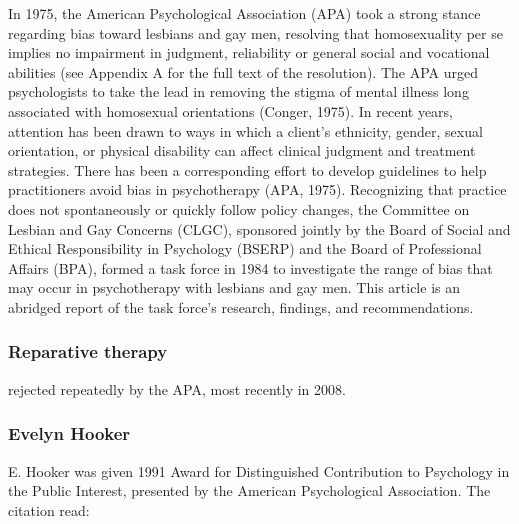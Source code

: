 \begin{refsection}
In 1975, the American Psychological Association (APA) took a strong stance regarding bias toward lesbians and gay men, resolving that homosexuality per se implies no impairment in judgment, reliability or general social and vocational abilities (see Appendix A for the full text of the resolution). The APA urged psychologists to take the lead in removing the stigma of mental illness long associated with homosexual orientations (Conger, 1975). In recent years, attention has been drawn to ways in which a client's ethnicity, gender, sexual orientation, or physical disability can affect clinical judgment and treatment strategies. There has been a corresponding effort to develop guidelines to help practitioners avoid bias in psychotherapy (APA, 1975). Recognizing that practice does not spontaneously or quickly follow policy changes, the Committee on Lesbian and Gay Concerns (CLGC), sponsored jointly by the Board of Social and Ethical Responsibility in Psychology (BSERP) and the Board of Professional Affairs (BPA), formed a task force in 1984 to investigate the range of bias that may occur in psychotherapy with lesbians and gay men. This article is an abridged report of the task force's research, findings, and recommendations.

\subsubsection{Reparative therapy}
\label{reparativetherapy}

rejected repeatedly by the APA, most recently in 2008.

\subsubsection{Evelyn Hooker}
\label{evelynhooker}

E. Hooker was given 1991 Award for Distinguished Contribution to Psychology in the Public Interest, presented by the American Psychological Association. The citation read:


\end{refsection}
